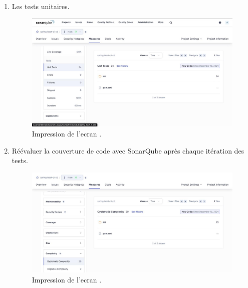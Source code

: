 \documentclass{article}
\begin{document}
\begin{enumerate}
    \item Les tests unitaires.
      \begin{figure}[H]
    \centering
    \includegraphics[width=1\linewidth]{assets/IMG-20241215-WA0005.jpg}
    \caption{\label{fig:frog6} Impression de l'ecran .}
    \end{figure}

    \item Réévaluer la couverture de code avec SonarQube après chaque itération des tests.
      \begin{figure}[H]
    \centering
    \includegraphics[width=1\linewidth]{assets/IMG-20241215-WA0007.jpg}
    \caption{\label{fig:frog7} Impression de l'ecran .}
    \end{figure}





\end{enumerate}
\end{document}
